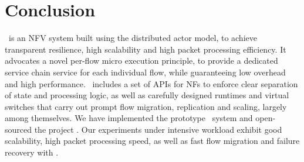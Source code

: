 \section{Conclusion}
\label{sec:conclusion}

\nfactor~is an NFV system built using the distributed actor model, to achieve transparent resilience, high scalability and high packet processing efficiency. It advocates a novel per-flow micro execution principle, to provide a dedicated service chain service for each individual flow, while guaranteeing low overhead and high performance. \nfactor~includes a set of APIs for NFs to enforce clear separation of state and processing logic, as well as carefully designed runtimes and virtual switches that carry out prompt flow migration, replication and scaling, largely among themselves. We have implemented the prototype \nfactor~system and open-sourced the project \cite{projectcode}. Our experiments under intensive workload exhibit good scalability, high packet processing speed, as well as fast flow migration and failure recovery with \nfactor.